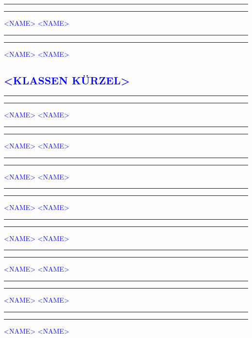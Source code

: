 \documentclass[fontsize=12pt,parskip=half]{scrartcl}
\begin{document}
\vspace{50pt}
\noindent\rule{7cm}{.4pt}\hfill\rule{7cm}{.4pt}\par
\noindent \textcolor{blue}{<NAME>} \hfill\textcolor{blue}{<NAME>}

\vspace{50pt}
\noindent\rule{7cm}{.4pt}\hfill\rule{7cm}{.4pt}\par
\noindent \textcolor{blue}{<NAME>} \hfill\textcolor{blue}{<NAME>}

\pagebreak
\subsection*{\textcolor{blue}{<KLASSEN KÜRZEL>}}
\vspace{50pt}
\noindent\rule{7cm}{.4pt}\hfill\rule{7cm}{.4pt}\par
\noindent \textcolor{blue}{<NAME>} \hfill\textcolor{blue}{<NAME>}

\vspace{50pt}
\noindent\rule{7cm}{.4pt}\hfill\rule{7cm}{.4pt}\par
\noindent \textcolor{blue}{<NAME>} \hfill\textcolor{blue}{<NAME>}

\vspace{50pt}
\noindent\rule{7cm}{.4pt}\hfill\rule{7cm}{.4pt}\par
\noindent \textcolor{blue}{<NAME>} \hfill\textcolor{blue}{<NAME>}

\vspace{50pt}
\noindent\rule{7cm}{.4pt}\hfill\rule{7cm}{.4pt}\par
\noindent \textcolor{blue}{<NAME>} \hfill\textcolor{blue}{<NAME>}

\vspace{50pt}
\noindent\rule{7cm}{.4pt}\hfill\rule{7cm}{.4pt}\par
\noindent \textcolor{blue}{<NAME>} \hfill\textcolor{blue}{<NAME>}

\vspace{50pt}
\noindent\rule{7cm}{.4pt}\hfill\rule{7cm}{.4pt}\par
\noindent \textcolor{blue}{<NAME>} \hfill\textcolor{blue}{<NAME>}

\vspace{50pt}
\noindent\rule{7cm}{.4pt}\hfill\rule{7cm}{.4pt}\par
\noindent \textcolor{blue}{<NAME>} \hfill\textcolor{blue}{<NAME>}

\vspace{50pt}
\noindent\rule{7cm}{.4pt}\hfill\rule{7cm}{.4pt}\par
\noindent \textcolor{blue}{<NAME>} \hfill\textcolor{blue}{<NAME>}
\end{document}
